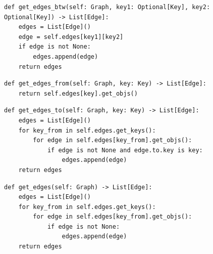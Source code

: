 \documentclass[mathserif, handout]{beamer}
\begin{document}
\begin{frame}[fragile]
	\begin{proofbox}
		\begin{lstlisting}[style=mypython]
def get_edges_btw(self: Graph, key1: Optional[Key], key2: Optional[Key]) -> List[Edge]:
    edges = List[Edge]()
    edge = self.edges[key1][key2]
    if edge is not None:
        edges.append(edge)
    return edges
\end{lstlisting}
	\end{proofbox}
\end{frame}

\begin{frame}[fragile]
	\begin{proofbox}
		\begin{lstlisting}[style=mypython]
def get_edges_from(self: Graph, key: Key) -> List[Edge]:
    return self.edges[key].get_objs()
\end{lstlisting}
	\end{proofbox}
\end{frame}

\begin{frame}[fragile]
	\begin{proofbox}
		\begin{lstlisting}[style=mypython]
def get_edges_to(self: Graph, key: Key) -> List[Edge]:
    edges = List[Edge]()
    for key_from in self.edges.get_keys():
        for edge in self.edges[key_from].get_objs():
            if edge is not None and edge.to.key is key:
                edges.append(edge)    
    return edges
\end{lstlisting}
	\end{proofbox}
\end{frame}

\begin{frame}[fragile]
	\begin{proofbox}
		\begin{lstlisting}[style=mypython]
def get_edges(self: Graph) -> List[Edge]:
    edges = List[Edge]()
    for key_from in self.edges.get_keys():
        for edge in self.edges[key_from].get_objs():
            if edge is not None:
                edges.append(edge)    
    return edges
\end{lstlisting}
	\end{proofbox}
\end{frame}
\end{document}
